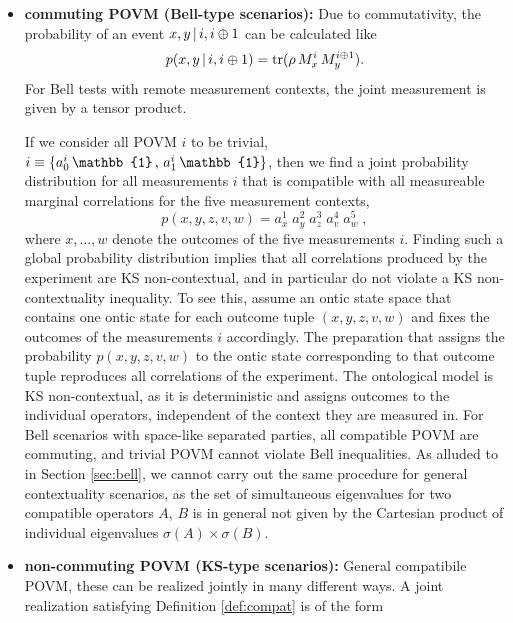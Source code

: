 \begin{itemize}
    \item \textbf{commuting POVM (Bell-type scenarios):}
    Due to commutativity, the probability of an event $x,y\thinspace\vert\thinspace i,i\oplus 1$ can be calculated like
    \begin{equation*}
        p(x,y\thinspace\vert\thinspace i,i\oplus 1) = \operatorname{tr}(\rho\thinspace M_x^i\thinspace M_y^{i\oplus 1}).
    \end{equation*}
    For Bell tests with remote measurement contexts, the joint measurement is given by a tensor product.
    
    If we consider all POVM $i$ to be trivial, $i\equiv\{a^i_0\thinspace\mathbb{1}\thinspace,\thinspace a^i_1\thinspace\mathbb{1}\}$, then we find a joint probability distribution for all measurements $i$ that is compatible with all measureable marginal correlations for the five measurement contexts,
    \begin{equation*}
        p(x,y,z,v,w)=a^1_{x}\;a^2_{y}\;a^3_{z}\;a^4_{v}\;a^5_{w}\;,
    \end{equation*}
    where $x,\dots,w$ denote the outcomes of the five measurements $i$. Finding such a global probability distribution implies that all correlations produced by the experiment are KS non-contextual, and in particular do not violate a KS non-contextuality inequality. To see this, assume an ontic state space that contains one ontic state for each outcome tuple $(x,y,z,v,w)$ and fixes the outcomes of the measurements $i$ accordingly. The preparation that assigns the probability $p(x,y,z,v,w)$ to the ontic state corresponding to that outcome tuple reproduces all correlations of the experiment. The ontological model is KS non-contextual, as it is deterministic and assigns outcomes to the individual operators, independent of the context they are measured in. For Bell scenarios with space-like separated parties, all compatible POVM are commuting, and trivial POVM cannot violate Bell inequalities. As alluded to in Section \ref{sec:bell}, we cannot carry out the same procedure for general contextuality scenarios, as the set of simultaneous eigenvalues for two compatible operators $A$, $B$ is in general not given by the Cartesian product of individual eigenvalues $\sigma(A)\times\sigma(B)$.
    \item \textbf{non-commuting POVM (KS-type scenarios):}
    General compatibile POVM, these can be realized jointly in many different ways. A joint realization satisfying Definition \ref{def:compat} is of the form \begin{equation*}

\end{equation*}
\end{itemize}
